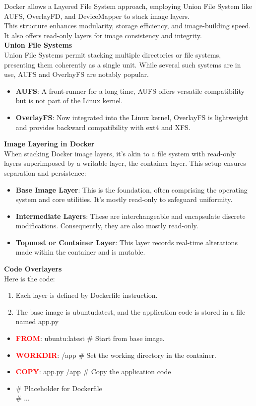 \documentclass{article}
\begin{document}
Docker allows a Layered File System approach, employing Union File System like AUFS, OverlayFD, and DeviceMapper to stack image layers. \\
This structure enhances modularity, storage efficiency, and image-building speed. It also offers read-only layers for image consistency and integrity. 
\\
\textbf{Union File Systems} \\
Union File Systems permit stacking multiple directories or file systems, presenting them coherently as a single unit. While several such systems  are in use, AUFS and OverlayFS are notably popular. 
\begin{itemize}
    \item \textbf{AUFS}: A front-runner for a long time, AUFS offers versatile compatibility but is not part of the Linux kernel. 
    \item \textbf{OverlayFS}: Now integrated into the Linux kernel, OverlayFS is lightweight and provides backward compatibility with ext4 and XFS. 
\end{itemize}
\textbf{Image Layering in Docker} \\
When stacking Docker image layers, it's akin to a file system with read-only layers superimposed by a writable layer, the container layer. This setup ensures separation and persistence:
\begin{itemize}
    \item \textbf{Base Image Layer}: This is the foundation, often comprising the operating system and core utilities. It's mostly read-only to safeguard uniformity.
    \item \textbf{Intermediate Layers}: These are interchangeable and encapsulate discrete modifications. Consequently, they are also mostly read-only.
    \item \textbf{Topmost or Container Layer}: This layer records real-time alterations made within the container and is mutable. 
\end{itemize}
\textbf{Code Overlayers} \\
Here is the code:
\begin{enumerate}
    \item Each layer is defined by Dockerfile instruction.
    \item The base image is ubuntu:latest, and the application code is stored in a file named app.py
\end{enumerate}
\begin{itemize}
    \item \textbf{\textcolor{Red}{FROM}}: \textcolor{PineGreen}{ubuntu:latest} $\#$ Start from base image.
    \item \textbf{\textcolor{Red}{WORKDIR}}: \textcolor{PineGreen}{ /app} $\#$ Set the working directory in the container. 
    \item \textbf{\textcolor{Red}{COPY}}: \textcolor{PineGreen}{app.py /app} $\#$ Copy the application code
    \item $\#$ Placeholder for Dockerfile \\ $\#$ ... 
\end{itemize}
\end{document}
